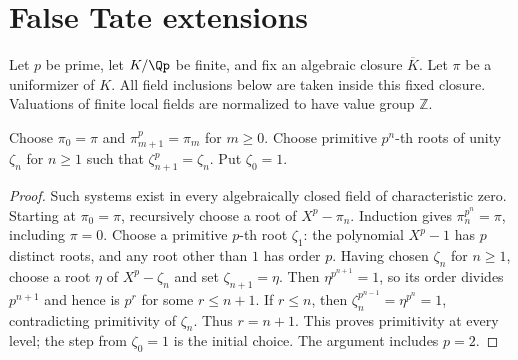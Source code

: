 \chapter{False Tate extensions}

Let $p$ be prime, let $K/\Qp$ be finite, and fix an algebraic closure
$\overline K$. Let $\pi$ be a uniformizer of $K$. All field inclusions below
are taken inside this fixed closure. Valuations of finite local fields are
normalized to have value group $\mathbb Z$.

\begin{definition}
\label{ft:compatible-roots}
\leanok
{}
Choose $\pi_0=\pi$ and $\pi_{m+1}^p=\pi_m$ for $m\geq0$.
Choose primitive $p^n$-th roots of unity $\zeta_n$ for $n\geq1$ such that
$\zeta_{n+1}^p=\zeta_n$. Put $\zeta_0=1$.
\end{definition}
\begin{proof}
Such systems exist in every algebraically closed field of characteristic
zero. Starting at $\pi_0=\pi$, recursively choose a root of
$X^p-\pi_n$. Induction gives $\pi_n^{p^n}=\pi$, including $\pi=0$.
Choose a primitive $p$-th root $\zeta_1$: the polynomial $X^p-1$ has
$p$ distinct roots, and any root other than $1$ has order $p$.
Having chosen $\zeta_n$ for $n\geq1$, choose a root $\eta$ of
$X^p-\zeta_n$ and set $\zeta_{n+1}=\eta$.
Then $\eta^{p^{n+1}}=1$, so its order divides $p^{n+1}$ and hence
is $p^r$ for some $r\leq n+1$. If $r\leq n$, then
$\zeta_n^{p^{n-1}}=\eta^{p^n}=1$, contradicting primitivity of
$\zeta_n$. Thus $r=n+1$. This proves primitivity at every level;
the step from $\zeta_0=1$ is the initial choice. The argument includes
$p=2$.
\end{proof}

